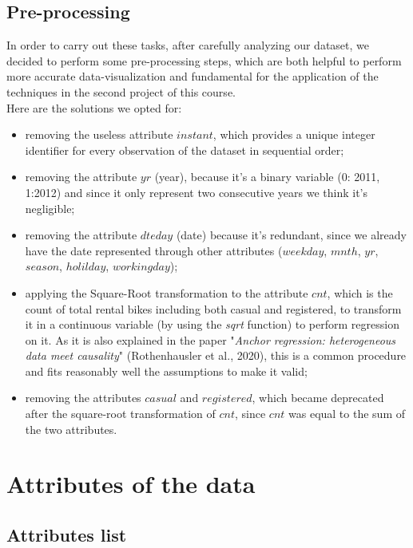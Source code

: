 \documentclass[11pt,a4paper]{article}
\begin{document}
\subsection{Pre-processing}
In order to carry out these tasks, after carefully analyzing our dataset, we decided to perform some pre-processing steps, which are both helpful to perform more accurate data-visualization and fundamental for the application of the techniques in the second project of this course.\\
Here are the solutions we opted for:

\begin{itemize}
    \item removing the useless attribute $instant$, which provides a unique integer identifier for every observation of the dataset in sequential order;
    \item removing the attribute $yr$ (year), because it's a binary variable (0: 2011, 1:2012) and since it only represent two consecutive years we think it's negligible; 
    \item removing the attribute $dteday$ (date) because it's redundant, since we already have the date represented through other attributes ($weekday$, $mnth$, $yr$, $season$, $holilday$, $workingday$);
    \item applying the Square-Root transformation to the attribute $cnt$, which is the count of total rental bikes including both casual and registered, to transform it in a continuous variable (by using the \textit{sqrt} function) to perform regression on it. As it is also explained in the paper "\textit{Anchor regression: heterogeneous data meet causality}" (Rothenhausler et al., 2020), this is a common procedure and fits reasonably well the assumptions to make it valid;
    \item removing the attributes $casual$ and $registered$, which became deprecated after the square-root transformation of $cnt$, since $cnt$ was equal to the sum of the two attributes.
\end{itemize}


    
   

    
\section{Attributes of the data}

\subsection{Attributes list}
\end{document}
